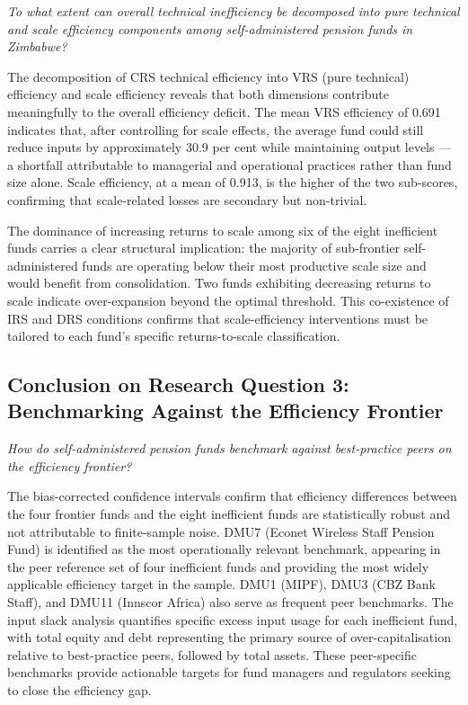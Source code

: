 \documentclass[12pt,a4paper]{article}
\begin{document}
\textit{To what extent can overall technical inefficiency be decomposed into pure technical and scale efficiency components among self-administered pension funds in Zimbabwe?}

The decomposition of CRS technical efficiency into VRS (pure technical) efficiency and scale efficiency reveals that both dimensions contribute meaningfully to the overall efficiency deficit. The mean VRS efficiency of 0.691 indicates that, after controlling for scale effects, the average fund could still reduce inputs by approximately 30.9 per cent while maintaining output levels --- a shortfall attributable to managerial and operational practices rather than fund size alone. Scale efficiency, at a mean of 0.913, is the higher of the two sub-scores, confirming that scale-related losses are secondary but non-trivial.

The dominance of increasing returns to scale among six of the eight inefficient funds carries a clear structural implication: the majority of sub-frontier self-administered funds are operating below their most productive scale size and would benefit from consolidation. Two funds exhibiting decreasing returns to scale indicate over-expansion beyond the optimal threshold. This co-existence of IRS and DRS conditions confirms that scale-efficiency interventions must be tailored to each fund's specific returns-to-scale classification.

\subsection{Conclusion on Research Question 3: Benchmarking Against the Efficiency Frontier}

\textit{How do self-administered pension funds benchmark against best-practice peers on the efficiency frontier?}

The bias-corrected confidence intervals confirm that efficiency differences between the four frontier funds and the eight inefficient funds are statistically robust and not attributable to finite-sample noise. DMU7 (Econet Wireless Staff Pension Fund) is identified as the most operationally relevant benchmark, appearing in the peer reference set of four inefficient funds and providing the most widely applicable efficiency target in the sample. DMU1 (MIPF), DMU3 (CBZ Bank Staff), and DMU11 (Innscor Africa) also serve as frequent peer benchmarks. The input slack analysis quantifies specific excess input usage for each inefficient fund, with total equity and debt representing the primary source of over-capitalisation relative to best-practice peers, followed by total assets. These peer-specific benchmarks provide actionable targets for fund managers and regulators seeking to close the efficiency gap.
\end{document}
